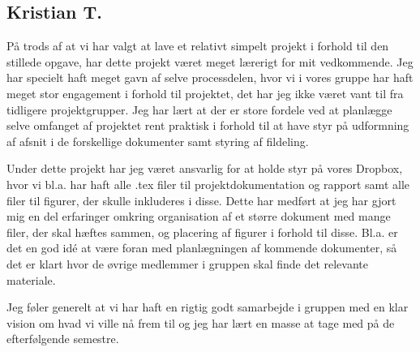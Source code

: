 \subsection{Kristian T.}

På trods af at vi har valgt at lave et relativt simpelt projekt i forhold til den stillede opgave, har dette projekt været meget lærerigt for mit vedkommende. 
Jeg har specielt haft meget gavn af selve processdelen, hvor vi i vores gruppe har haft meget stor engagement i forhold til projektet, det har jeg ikke været vant til fra tidligere projektgrupper.
Jeg har lært at der er store fordele ved at planlægge selve omfanget af projektet rent praktisk i forhold til at have styr på udformning af afsnit i de forskellige dokumenter samt styring af fildeling. 

Under dette projekt har jeg været ansvarlig for at holde styr på vores Dropbox, hvor vi bl.a. har haft alle .tex filer til projektdokumentation og rapport samt alle filer til figurer, der skulle inkluderes i disse.
Dette har medført at jeg har gjort mig en del erfaringer omkring organisation af et større dokument med mange filer, der skal hæftes sammen, og placering af figurer i forhold til disse.
Bl.a. er det en god idé at være foran med planlægningen af kommende dokumenter, så det er klart hvor de øvrige medlemmer i gruppen skal finde det relevante materiale.

Jeg føler generelt at vi har haft en rigtig godt samarbejde i gruppen med en klar vision om hvad vi ville nå frem til og jeg har lært en masse at tage med på de efterfølgende semestre. 

